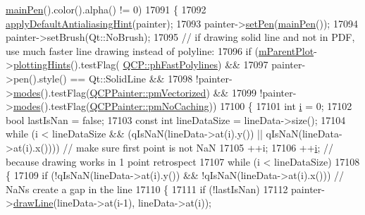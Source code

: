 \begin{DoxyCode}
      \hyperlink{class_q_c_p_abstract_plottable_a19276ed2382a3a06464417b8788b1451}{mainPen}().color().alpha() != 0)
17091   \{
17092     \hyperlink{class_q_c_p_abstract_plottable_a76e9d6cc7972dc1528f526d163766aca}{applyDefaultAntialiasingHint}(painter);
17093     painter->\hyperlink{class_q_c_p_painter_af9c7a4cd1791403901f8c5b82a150195}{setPen}(\hyperlink{class_q_c_p_abstract_plottable_a19276ed2382a3a06464417b8788b1451}{mainPen}());
17094     painter->setBrush(Qt::NoBrush);
17095     \textcolor{comment}{// if drawing solid line and not in PDF, use much faster line drawing instead of polyline:}
17096     \textcolor{keywordflow}{if} (\hyperlink{class_q_c_p_layerable_aa2a528433e44db02b8aef23c1f9f90ed}{mParentPlot}->\hyperlink{class_q_custom_plot_a130b55e205697a5288081e9fc11e443e}{plottingHints}().testFlag(
      \hyperlink{namespace_q_c_p_a5400e5fcb9528d92002ddb938c1f4ef4aa5fd227bc878c56ad2a87ea32c74ee4d}{QCP::phFastPolylines}) &&
17097         painter->pen().style() == Qt::SolidLine &&
17098         !painter->\hyperlink{class_q_c_p_painter_a99b89eaf5363faaa1e1e6162856f436c}{modes}().testFlag(\hyperlink{class_q_c_p_painter_a156cf16444ff5e0d81a73c615fdb156daeda679cd55dcd468341d07d48a30b6ab}{QCPPainter::pmVectorized}) &&
17099         !painter->\hyperlink{class_q_c_p_painter_a99b89eaf5363faaa1e1e6162856f436c}{modes}().testFlag(\hyperlink{class_q_c_p_painter_a156cf16444ff5e0d81a73c615fdb156dae78f9a4eb277a5f9207f50850a51a0b0}{QCPPainter::pmNoCaching}))
17100     \{
17101       \textcolor{keywordtype}{int} \hyperlink{_comparision_pictures_2_createtest_image_8m_a6f6ccfcf58b31cb6412107d9d5281426}{i} = 0;
17102       \textcolor{keywordtype}{bool} lastIsNan = \textcolor{keyword}{false};
17103       \textcolor{keyword}{const} \textcolor{keywordtype}{int} lineDataSize = lineData->size();
17104       \textcolor{keywordflow}{while} (i < lineDataSize && (qIsNaN(lineData->at(i).y()) || qIsNaN(lineData->at(i).x()))) \textcolor{comment}{// make sure
       first point is not NaN}
17105         ++i;
17106       ++\hyperlink{_comparision_pictures_2_createtest_image_8m_a6f6ccfcf58b31cb6412107d9d5281426}{i}; \textcolor{comment}{// because drawing works in 1 point retrospect}
17107       \textcolor{keywordflow}{while} (i < lineDataSize)
17108       \{
17109         \textcolor{keywordflow}{if} (!qIsNaN(lineData->at(i).y()) && !qIsNaN(lineData->at(i).x())) \textcolor{comment}{// NaNs create a gap in the line}
17110         \{
17111           \textcolor{keywordflow}{if} (!lastIsNan)
17112             painter->\hyperlink{class_q_c_p_painter_a0b4b1b9bd495e182c731774dc800e6e0}{drawLine}(lineData->at(i-1), lineData->at(i));

\end{DoxyCode}
